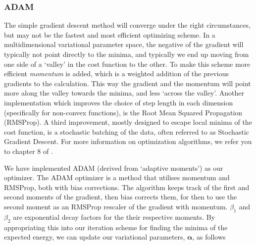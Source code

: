 






\subsubsection{ADAM}

The simple gradient descent method will converge under the right circumstances, but may not be the fastest and most efficient optimizing scheme. In a multidimensional variational parameter space, the negative of the gradient will typically not point directly to the minima, and typically we end up moving from one side of a `valley' in the cost function to the other. To make this scheme more efficient \textit{momentum} is added, which is a weighted addition of the previous gradients to the calculation. This way the gradient and the momentum will point more along the valley towards the minima, and less `across the valley'. Another implementation which improves the choice of step length in each dimension (specifically for non-convex functions), is the Root Mean Squared Propagation (RMSProp). A third improvement, mostly designed to escape local minima of the cost function, is a stochastic batching of the data, often referred to as Stochastic Gradient Descent. For more information on optimization algorithms, we refer you to chapter 8 of \citep{Goodfellow-et-al-2016}. 

We have implemented ADAM (derived from `adaptive moments') as our optimizer. The ADAM optimizer \citep{kingma2017adam} is a method that utilises momentum and RMSProp, both with bias corrections. The algorithm keeps track of the first and second moments of the gradient, then bias corrects them, for then to use the second moment as an RMSProp rescaler of the gradient with momentum. $\beta_1$ and $\beta_2$ are exponential decay factors for the their respective moments. 
By appropriating this into our iteration scheme for finding the minima of the expected energy, we can update our variational parameters, $\bm{\alpha}$, as follows

